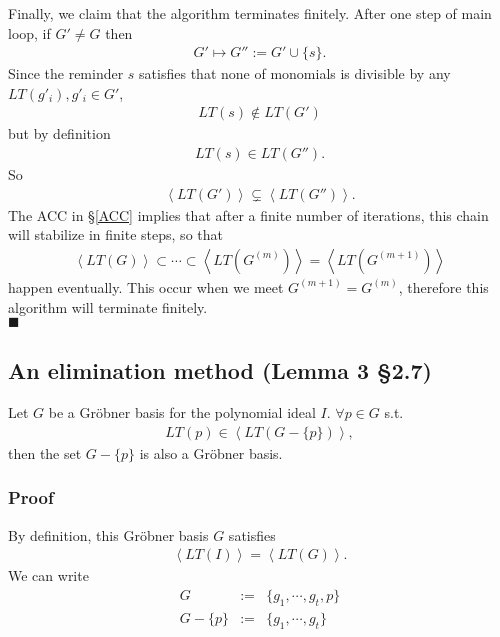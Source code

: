 \documentclass[11pt]{book}
\begin{document}
Finally, we claim that the algorithm terminates finitely.
After one step of main loop, if $G' \neq G$ then 
\begin{eqnarray}
G' \mapsto G'' := G' \cup \{s \}.
\end{eqnarray}
Since the reminder $s$ satisfies that none of monomials is divisible by any $LT(g'_i), g'_i \in G'$,
\begin{eqnarray}
LT(s) \notin LT(G')
\end{eqnarray}
but by definition
\begin{eqnarray}
LT(s) \in LT(G'').
\end{eqnarray}
So
\begin{eqnarray}
\left<LT(G') \right> \subsetneq \left<LT(G'') \right>.
\end{eqnarray}
The ACC in \S\ref{ACC} implies that after a finite number of iterations, this chain will stabilize in finite steps, so that
\begin{eqnarray}
\left<LT(G) \right> \subset \cdots \subset \left<LT(G^{(m)}) \right> = \left<LT(G^{(m+1)}) \right>
\end{eqnarray}
happen eventually.
This occur when we meet $G^{(m+1)} = G^{(m)}$, therefore this algorithm will terminate finitely.\\
$\blacksquare$

\subsection{An elimination method (Lemma 3 \S2.7)}
Let $G$ be a Gr\"obner basis for the polynomial ideal $I$.
$\forall p \in G$ s.t. 
\begin{eqnarray}
LT(p) \in \left< LT(G - \{p\}) \right>,
\end{eqnarray}
then the set $G - \{p\}$ is also a Gr\"obner basis.

\subsubsection{Proof}
By definition, this Gr\"obner basis $G$ satisfies
\begin{eqnarray}
\left<LT(I)\right> = \left<LT(G) \right>.
\end{eqnarray}
We can write
\begin{eqnarray}
G &:=& \{g_1, \cdots, g_t, p\} \\
G - \{p\} &:=& \{g_1, \cdots, g_t\}
\end{eqnarray}
\end{document}
